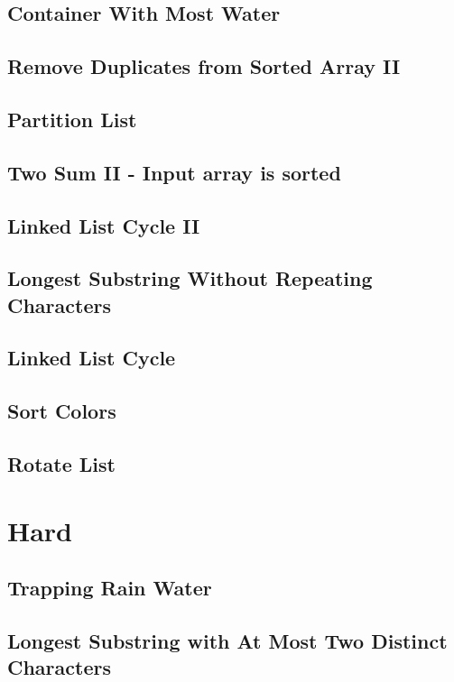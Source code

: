 \documentclass[12pt]{book}
\begin{document}
\subsection{Container With Most Water}
\label{sec-15-2-4}
\subsection{Remove Duplicates from Sorted Array II}
\label{sec-15-2-5}
\subsection{Partition List}
\label{sec-15-2-6}
\subsection{Two Sum II - Input array is sorted}
\label{sec-15-2-7}
\subsection{Linked List Cycle II}
\label{sec-15-2-8}
\subsection{Longest Substring Without Repeating Characters}
\label{sec-15-2-9}
\subsection{Linked List Cycle}
\label{sec-15-2-10}
\subsection{Sort Colors}
\label{sec-15-2-11}
\subsection{Rotate List}
\label{sec-15-2-12}
\section{Hard}
\label{sec-15-3}
\subsection{Trapping Rain Water}
\label{sec-15-3-1}
\subsection{Longest Substring with At Most Two Distinct Characters}
\label{sec-15-3-2}
\end{document}
